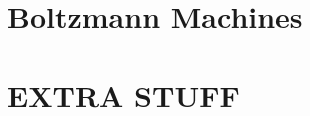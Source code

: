 \documentclass[a4paper,12pt,oneside,onecolumn,final,fleqn]{config/repUERJ}
\begin{document}
\chapter{Boltzmann Machines}%
\label{ch:bm}%



\chapter{EXTRA STUFF}








\end{document}
